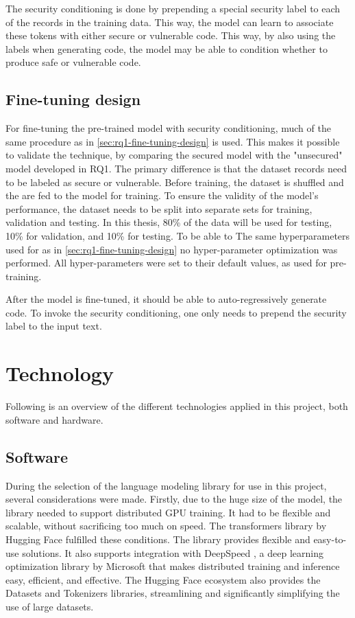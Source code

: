 The security conditioning is done by prepending a special security label to each of the records in the training data. This way, the model can learn to associate these tokens with either secure or vulnerable code. This way, by also using the labels when generating code, the model may be able to condition whether to produce safe or vulnerable code.

\subsection{Fine-tuning design}
\label{sec:rq2-fine-tuning-design}
For fine-tuning the pre-trained model with security conditioning, much of the same procedure as in \cref{sec:rq1-fine-tuning-design} is used. This makes it possible to validate the technique, by comparing the secured model with the "unsecured" model developed in RQ1. The primary difference is that the dataset records need to be labeled as secure or vulnerable. Before training, the dataset is shuffled and the  are fed to the model for training. To ensure the validity of the model's performance, the dataset needs to be split into separate sets for training, validation and testing. In this thesis, 80\% of the data will be used for testing, 10\% for validation, and 10\% for testing. To be able to The same hyperparameters used for as in \cref{sec:rq1-fine-tuning-design} no hyper-parameter optimization was performed. All hyper-parameters were set to their default values, as used for pre-training.

After the model is fine-tuned, it should be able to auto-regressively generate  code. To invoke the security conditioning, one only needs to prepend the security label to the input text.

\section{Technology}
\label{sec:technology}
Following is an overview of the different technologies applied in this project, both software and hardware.

\subsection{Software}
\label{sec:software}
During the selection of the language modeling library for use in this project, several considerations were made. Firstly, due to the huge size of the model, the library needed to support distributed GPU training. It had to be flexible and scalable, without sacrificing too much on speed. The transformers \cite{transformers} library by Hugging Face \cite{huggingface} fulfilled these conditions. The library provides flexible and easy-to-use solutions. It also supports integration with DeepSpeed \cite{deepspeed}, a deep learning optimization library by Microsoft \cite{microsoft} that makes distributed training and inference easy, efficient, and effective. The Hugging Face ecosystem also provides the Datasets and Tokenizers libraries, streamlining and significantly simplifying the use of large datasets.

